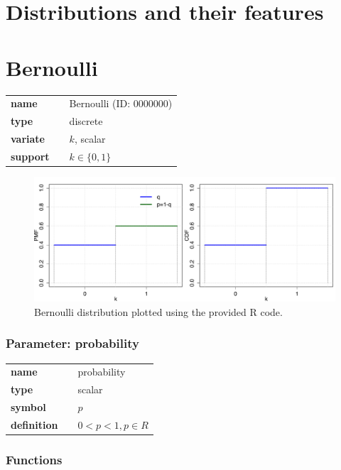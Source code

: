 \section{Distributions and their features}

\section*{Bernoulli} 

  \bigskip 

\begin{tabular}{p{2cm}cl}
\textbf{name} & & Bernoulli (ID: 0000000)\\ 
 
\textbf{type} & & discrete \\ 

\textbf{variate} & & $k$, scalar \\ 

\textbf{support} & & $k \in \{0,1\}$
\end{tabular}

\begin{figure}[ht!]
\centering
  \includegraphics[width=140mm]{pics/Bernoulli.pdf}
 \caption{Bernoulli distribution plotted using the provided R code.}
 \label{fig:Bernoulli}
\end{figure}

\subsubsection*{Parameter: probability}

\noindent\begin{tabular}{p{2cm}cl}
\textbf{name} & & probability \\
\textbf{type} & & scalar \\
\textbf{symbol} & & $p$  \\
\textbf{definition} & & $0<p<1, p \in  R$
\end{tabular}
\subsubsection*{Functions}

